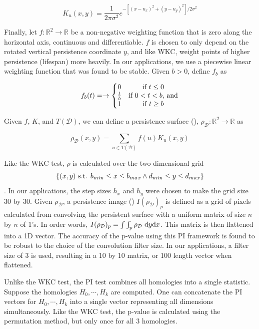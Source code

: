 \documentclass[12pt]{article}
\begin{document}
\[ K_{u}(x,y) = \frac{1}{2\pi\sigma^{2}}e^{-[(x - u_{x})^{2} + (y-u_{y})^{2}]/2\sigma^{2}} \]

Finally, let $f : \mathbb{R}^{2} \rightarrow \mathbb{R}$ be a non-negative weighting function that is zero along the horizontal axis, continuous and differentiable. $f$ is chosen to only depend on the rotated vertical persistence coordinate $y$, and like WKC, weight points of higher persistence (lifespan) more heavily. In our applications, we use a piecewise linear weighting function that was found to be stable. Given $b > 0$, define $f_{b}$ as

\[ f_{b}(t) = \rightarrow \left\{\begin{matrix}
0 & \textup{if } t \leq 0 \\ 
\frac{t}{b} & \textup{if } 0 < t < b\textup{, and}\\ 
1 & \textup{if } t \geq b 
\end{matrix}\right. \]

Given $f$, $K$, and $T(\mathcal{D})$, we can define a persistence surface (\cite{adams2015persistent}), $\rho_{\mathcal{D}} : \mathbb{R}^{2} \rightarrow \mathbb{R}$ as 

\[ \rho_{\mathcal{D}}(x, y) = \sum_{u \in T(\mathcal{D})} f(u)K_{u}(x,y) \]

Like the WKC test, $\rho$ is calculated over the two-dimensional grid \[ \{ (x, y) \textup{ s.t. } b_{min} \leq x \leq b_{max} \wedge d_{min} \leq y \leq d_{max} \} \]. In our applications, the step sizes $h_{x}$ and $h_{y}$ were chosen to make the grid size 30 by 30. Given $\rho_{\mathcal{D}}$, a persistence image (\cite{adams2015persistent}) $I(\rho_{\mathcal{D}})_{p}$ is defined as a grid of pixels calculated from convolving the persistent surface with a uniform matrix of size $n$ by $n$ of 1's. In order words, $I(\rho_{\mathcal{D}})_{p} = \int\int_{p} \rho_{\mathcal{D}} \textup{ d}y\textup{d}x$. This matrix is then flattened into a 1D vector.  The accuracy of the p-value using this PI framework is found to be robust to the choice of the convolution filter size. In our applications, a filter size of 3 is used, resulting in a 10 by 10 matrix, or 100 length vector when flattened.

Unlike the WKC test, the PI test combines all homologies into a single statistic. Suppose the homologies $H_{0}, \cdots, H_{k}$ are computed. One can concatenate the PI vectors for $H_{0}, \cdots, H_{k}$ into a single vector representing all dimensions simultaneously. Like the WKC test, the p-value is calculated using the permutation method, but only once for all 3 homologies.
\end{document}
